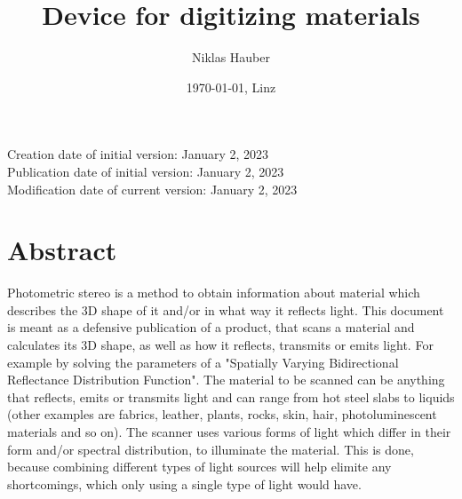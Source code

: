 \documentclass[11pt, twoside, listof=totocnumbered, bibliography=totocnumbered]{scrartcl}
\title{Device for digitizing materials}
\author{Niklas Hauber}
\date{\today{}, Linz}
\begin{document}
\maketitle
Creation date of initial version: January 2, 2023\\
Publication date of initial version: January 2, 2023\\
Modification date of current version: January 2, 2023\\

\section{Abstract}
Photometric stereo is a method to obtain information about material which describes the 3D shape of it and/or in what way it reflects light. This document is meant as a defensive publication of a product, that scans a material and calculates its 3D shape, as well as how it reflects, transmits or emits light. For example by solving the parameters of a "Spatially Varying Bidirectional Reflectance Distribution Function". The material to be scanned can be anything that reflects, emits or transmits light and can range from hot steel slabs to liquids (other examples are fabrics, leather, plants, rocks, skin, hair, photoluminescent materials and so on). The scanner uses various forms of light which differ in their form and/or spectral distribution, to illuminate the material. This is done, because combining different types of light sources will help elimite any shortcomings, which only using a single type of light would have. \cite{SURVEY}
\end{document}

